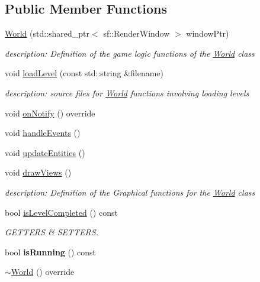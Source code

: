 \subsection*{Public Member Functions}
\begin{DoxyCompactItemize}
\item 
\hyperlink{classWorld_a96ca734b18df2cf85e666fc6d358e12c}{World} (std\+::shared\+\_\+ptr$<$ sf\+::\+Render\+Window $>$ window\+Ptr)
\begin{DoxyCompactList}\small\item\em description\+: Definition of the game logic functions of the \hyperlink{classWorld}{World} class \end{DoxyCompactList}\item 
void \hyperlink{classWorld_a6a08c827c3a0def12b7700211353735f}{load\+Level} (const std\+::string \&filename)
\begin{DoxyCompactList}\small\item\em description\+: source files for \hyperlink{classWorld}{World} functions involving loading levels \end{DoxyCompactList}\item 
void \hyperlink{classWorld_a91c2d7b127190f17a6cd85743245fb5b}{on\+Notify} () override
\item 
void \hyperlink{classWorld_ad37fe32cce284282361b9e7397b27a23}{handle\+Events} ()
\item 
void \hyperlink{classWorld_a5cc73b1aa54db5da01e4004acd4fd8bb}{update\+Entities} ()
\item 
void \hyperlink{classWorld_a8e8ad60668f8fe975f03bcb612264bc4}{draw\+Views} ()
\begin{DoxyCompactList}\small\item\em description\+: Definition of the Graphical functions for the \hyperlink{classWorld}{World} class \end{DoxyCompactList}\item 
\mbox{\label{classWorld_a89826be651c0ea4c8965403cd0b8138c}} 
bool \hyperlink{classWorld_a89826be651c0ea4c8965403cd0b8138c}{is\+Level\+Completed} () const
\begin{DoxyCompactList}\small\item\em G\+E\+T\+T\+E\+RS \& S\+E\+T\+T\+E\+RS. \end{DoxyCompactList}\item 
\mbox{\label{classWorld_a6ec812e86ad7813ff1a2c92ea6d85824}} 
bool {\bfseries is\+Running} () const
\item 
\hyperlink{classWorld_adf5e8724afb4d083e566ee4e48905bf2}{$\sim$\+World} () override
\end{DoxyCompactItemize}
